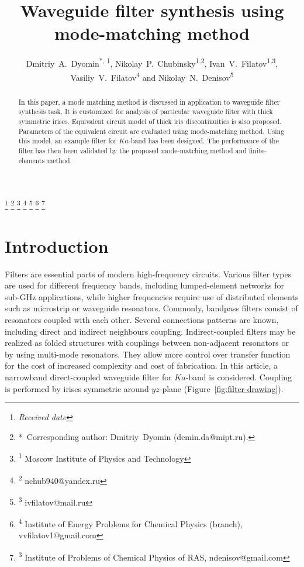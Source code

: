 \documentclass{pj}
\begin{document}
\setcounter{page}{1}

\title%
[Waveguide filter synthesis using mode-matching method]%
{Waveguide filter synthesis using mode-matching method}

\author{
  Dmitriy~A.~Dyomin\textsuperscript{*, 1},
  Nikolay~P.~Chubinsky\textsuperscript{1,2},
  Ivan~V.~Filatov\textsuperscript{1,3},
  Vasiliy~V.~Filatov\textsuperscript{4} and
  Nikolay~N.~Denisov\textsuperscript{5}
}

\footnote{\it Received date}
\setcounter{footnote}{0}
\footnote{\hskip-0.12in*\,
  Corresponding author: Dmitriy~Dyomin (demin.da@mipt.ru).}
\setcounter{footnote}{0}
\footnote{\hskip-0.12in\textsuperscript{1}
  Moscow Institute of Physics and Technology}
\setcounter{footnote}{0}
\footnote{\hskip-0.12in\textsuperscript{2}
  nchub940@yandex.ru}
\setcounter{footnote}{0}
\footnote{\hskip-0.12in\textsuperscript{3}
  ivfilatov@mail.ru}
\setcounter{footnote}{0}
\footnote{\hskip-0.12in\textsuperscript{4}
  Institute of Energy Problems for Chemical Physics (branch),
  vvfilatov1@gmail.com}
\setcounter{footnote}{0}
\footnote{\hskip-0.12in\textsuperscript{3} Institute of Problems of
  Chemical Physics of RAS, ndenisov@gmail.com}
\setcounter{footnote}{0}


\begin{abstract}
  In this paper, a mode matching method is discussed in application to
  waveguide filter synthesis task. It is customized for analysis of
  particular waveguide filter with thick symmetric irises. Equivalent
  circuit model of thick iris discontinuities is also
  proposed. Parameters of the equivalent circuit are evaluated using
  mode-matching method. Using this model, an example filter for
  $Ka$-band has been designed. The performance of the filter has then
  been validated by the proposed mode-matching method and
  finite-elements method.
\end{abstract}

\section{Introduction}
\label{sec:introduction}

Filters are essential parts of modern high-frequency circuits.
Various filter types are used for different frequency bands, including
lumped-element networks for sub-GHz applications, while higher
frequencies require use of distributed elements such as microstrip or
waveguide resonators. Commonly, bandpass filters consist of resonators
coupled with each other. Several connections patterns are known,
including direct and indirect neighbours coupling. Indirect-coupled
filters may be realized as folded structures with couplings between
non-adjacent resonators or by using multi-mode resonators. They allow
more control over transfer function for the cost of increased
complexity and cost of fabrication. In this article, a narrowband
direct-coupled waveguide filter for $Ka$-band is considered. Coupling
is performed by irises symmetric around $yz$-plane
(Figure~\ref{fig:filter-drawing}).
\end{document}
